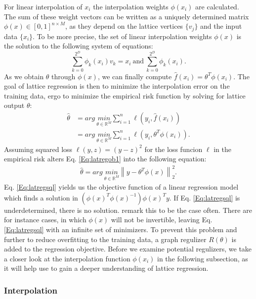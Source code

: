 For linear interpolation of $x_i$ the interpolation weights $\phi(x_i)$ are calculated. The sum of these weight vectors can be written as a uniquely determined matrix $\phi(x) \in [0,1]^{n\times M}$, as they depend on the lattice vertices $\{v_j\}$ and the input data $\{x_i\}$. To be more precise, the set of linear interpolation weights $\phi(x)$ is the solution to the following system of equations:
\begin{equation}
\sum_{k=0}^{2^D} \phi_k(x_i) v_k = x_i\ \mathrm{and}\ \sum_{k=0}^{2^D} \phi_k(x_i) .
\label{Eq:latregsys}
\end{equation}
As we obtain $\theta$ through $\phi(x)$, we can finally compute $\hat{f}(x_i) = \theta^T \phi(x_i)$. The goal of lattice regression is then to minimize the interpolation error on the training data, ergo to minimize the empirical risk function by solving for lattice output $\theta$: 
\begin{align}
\hat{\theta}& = arg\ \underset{\theta \in \mathbb{R}^M}{min} \sum_{i = 1}^{n} \ell(y_i, \hat{f}(x_i)) \nonumber \\
& = arg\ \underset{\theta \in \mathbb{R}^M}{min} \sum_{i = 1}^{n} \ell(y_i, \theta^T \phi(x_i)).
\label{Eq:latregob1}
\end{align}
Assuming squared loss $\ell(y,z)=(y-z)^2$ for the loss funcion $\ell$ in the empirical risk alters Eq. \ref{Eq:latregob1} into the following equation:
\begin{align}
\hat{\theta} = arg\ \underset{\theta \in \mathbb{R}^M}{min} \left\| y - \theta^T \phi(x) \right\|_2^2.
	\label{Eq:latregsql}
\end{align}
Eq. \ref{Eq:latregsql} yields us the objective function of a linear regression model which finds a solution in $(\phi(x)^T\phi(x)^{-1})\phi(x)^T y$. If Eq. \ref{Eq:latregsql} is underdetermined, there is no solution. \citep{garcia2012optimized} remark this to be the case often. There are for instance cases, in which $\phi(x)$ will not be invertible, leaving Eq. \ref{Eq:latregsql} with an infinite set of minimizers. To prevent this problem and further to reduce overfitting to the training data, a graph regulizer $R(\theta)$ is added to the regression objective. Before we examine potential regulizers, we take a closer look at the interpolation function $\phi(x_i)$ in the following subsection, as it will help use to gain a deeper understanding of lattice regression.


\subsubsection{Interpolation}

